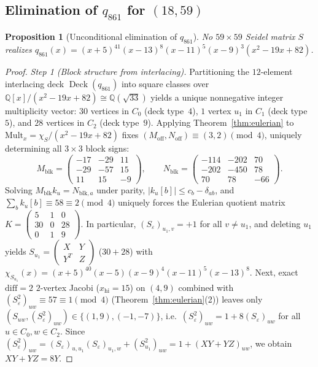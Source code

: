 \documentclass[11pt,reqno]{amsart}
\newtheorem{proposition}[theorem]{Proposition}
\theoremstyle{definition}
\theoremstyle{remark}
\numberwithin{equation}{section}
\numberwithin{table}{section}
\DeclareMathOperator{\Deck}{Deck}
\begin{document}
\subsection{Elimination of \texorpdfstring{$q_{861}$}{q\_861} for \texorpdfstring{$(18, 59)$}{(18, 59)}}
\begin{proposition}[Unconditional elimination of $q_{861}$]\label{prop:kill861}
No $59 \times 59$ Seidel matrix $S$ realizes $q_{861}(x) = (x + 5)^{41}(x - 13)^8(x - 11)^5(x - 9)^3(x^2 - 19x + 82)$.
\end{proposition}

\begin{proof}
\emph{Step 1 (Block structure from interlacing).}
Partitioning the $12$-element interlacing deck $\Deck(q_{861})$ into square classes over $\mathbb{Q}[x]/(x^2 - 19x + 82) \cong \mathbb{Q}(\sqrt{33})$ yields a unique nonnegative integer multiplicity vector: $30$ vertices in $C_0$ (deck type~$4$), $1$ vertex $u_1$ in $C_1$ (deck type~$5$), and $28$ vertices in $C_2$ (deck type~$9$). Applying Theorem~\ref{thm:eulerian} to $\mathrm{Mult}_x = \chi_S / (x^2 - 19x + 82)$ fixes $(M_{\mathrm{off}}, N_{\mathrm{off}}) \equiv (3, 2) \pmod 4$, uniquely determining all $3 \times 3$ block signs:
\[
  M_{\mathrm{blk}} = \begin{pmatrix} -17 & -29 & 11 \\ -29 & -57 & 15 \\ 11 & 15 & -9 \end{pmatrix}, \qquad
  N_{\mathrm{blk}} = \begin{pmatrix} -114 & -202 & 70 \\ -202 & -450 & 78 \\ 70 & 78 & -66 \end{pmatrix}.
\]
Solving $M_{\mathrm{blk}} k_u = N_{\mathrm{blk}, a}$ under parity, $|k_u[b]| \le c_b - \delta_{ab}$, and $\sum_b k_u[b] \equiv 58 \equiv 2 \pmod 4$ uniquely forces the Eulerian quotient matrix $K = \left(\begin{smallmatrix} 5 & 1 & 0 \\ 30 & 0 & 28 \\ 0 & 1 & 9 \end{smallmatrix}\right)$. In particular, $(S_\varepsilon)_{u_1, v} = +1$ for all $v \neq u_1$, and deleting $u_1$ yields $S_{u_1} = \left(\begin{smallmatrix} X & Y \\ Y^T & Z \end{smallmatrix}\right)$ ($30 + 28$) with $\chi_{S_{u_1}}(x) = (x+5)^{40}(x-5)(x-9)^4(x-11)^5(x-13)^8$. Next, exact $\mathrm{diff}=2$ $2$-vertex Jacobi ($x_{\mathrm{hi}} = 15$) on $(4, 9)$ combined with $(S_\varepsilon^2)_{uw} \equiv 57 \equiv 1 \pmod 4$ (Theorem~\ref{thm:eulerian}(2)) leaves only $(S_{uw}, (S_\varepsilon^2)_{uw}) \in \{(1, 9), (-1, -7)\}$, i.e.\ $(S_\varepsilon^2)_{uw} = 1 + 8(S_\varepsilon)_{uw}$ for all $u \in C_0, w \in C_2$. Since $(S_\varepsilon^2)_{uw} = (S_\varepsilon)_{u, u_1}(S_\varepsilon)_{u_1, w} + (S_{u_1}^2)_{uw} = 1 + (XY + YZ)_{uw}$, we obtain $XY + YZ = 8Y$.


\end{proof}
\end{document}
